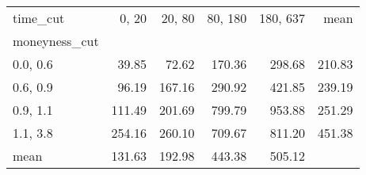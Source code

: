 \begin{tabular}{lrrrrr}
\toprule
time\_cut &  0, 20 &  20, 80 &  80, 180 &  180, 637 &   mean \\
moneyness\_cut &          &           &            &             &        \\
\midrule
0.0, 0.6    &    39.85 &     72.62 &     170.36 &      298.68 & 210.83 \\
0.6, 0.9    &    96.19 &    167.16 &     290.92 &      421.85 & 239.19 \\
0.9, 1.1    &   111.49 &    201.69 &     799.79 &      953.88 & 251.29 \\
1.1, 3.8    &   254.16 &    260.10 &     709.67 &      811.20 & 451.38 \\
mean          &   131.63 &    192.98 &     443.38 &      505.12 &        \\
\bottomrule
\end{tabular}
